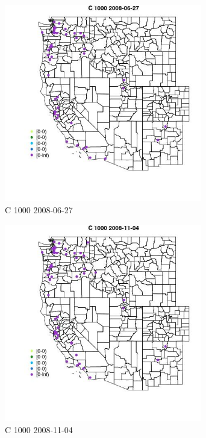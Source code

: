 \begin{figure} 
\centering  
\includegraphics[width=0.77\textwidth]{Code_Outputs/Report_ML_input_PM25_Step4_part_e_de_duplicated_aves_MapObsC_10002008-06-27.jpg} 
\caption{\label{fig:Report_ML_input_PM25_Step4_part_e_de_duplicated_avesMapObsC_10002008-06-27}C 1000 2008-06-27} 
\end{figure} 
 

\clearpage 

\begin{figure} 
\centering  
\includegraphics[width=0.77\textwidth]{Code_Outputs/Report_ML_input_PM25_Step4_part_e_de_duplicated_aves_MapObsC_10002008-11-04.jpg} 
\caption{\label{fig:Report_ML_input_PM25_Step4_part_e_de_duplicated_avesMapObsC_10002008-11-04}C 1000 2008-11-04} 
\end{figure} 
 

